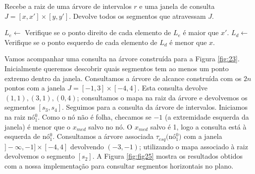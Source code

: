 \begin{algorithm}[h!]
    \caption{Recebe a raiz de uma árvore de intervalos $r$ e uma janela de consulta $J=[x,x']\times[y, y']$. Devolve todos os segmentos que atravessam $J$.}
    \begin{algorithmic}[1]
                    \State $L_e\leftarrow$\Call{BuscaEmAlcance2D}{$\tau_{esq}(r)$ , $]-\infty, x] \times [y, y']$}
                    \State Verifique se o ponto direito de cada elemento de $L_e$ é maior que $x'$.
                    \State {}
                \Else
                    \State $L_d\leftarrow$ \Call{BuscaEmAlcance2D}{$\tau_{dir}(r)$ , $[x', \infty [ \times [y, y']$}
                    \State Verifique se o ponto esquerdo de cada elemento de $L_d$ é menor que $x$.
                    \State {}
                \EndIf
            \EndIf
        \EndFunction
    \end{algorithmic}
\end{algorithm}

Vamos acompanhar uma consulta na árvore construída para a Figura \ref{fig:23}. Inicialmente queremos descobrir quais segmentos tem ao menos um ponto extremo dentro da janela. Consultamos a árvore de alcance construída com os $2n$ pontos com a janela $J=[-1,3]\times[-4,4]$. Esta consulta devolve $(1,1), (3,1), (0,4)$; consultamos o mapa na raiz da árvore e devolvemos os segmentos $[s_3, s_4]$. Seguimos para a consulta da árvore de intervalos. Iniciamos na raiz nó$^0_1$. Como o nó não é folha, checamos se $-1$ (a extremidade esquerda da janela) é menor que o $x_{med}$ salvo no nó. O $x_{med}$ salvo é 1, logo a consulta está à esquerda de nó$^0_1$. Consultamos a árvore associada $\tau_{esq}($nó$^0_1)$ com a janela  $]-\infty, -1] \times [-4, 4]$ devolvendo $(-3, -1)$; utilizando o mapa associado à raiz devolvemos o segmento $[s_2]$.
A Figura \ref{fig:fig25} mostra os resultados obtidos com a nossa implementação para consultar segmentos horizontais no plano.

